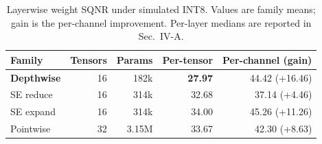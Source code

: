 \documentclass[conference,a4paper]{IEEEtran}
\begin{document}
\begin{table}[htbp]
\caption{Selective per-family static QDQ ablation for EfficientNet-B0 (MinMax, first 100 class-ordered training images, Coccidiosis only). Families are grouped from the ONNX graph; FP32 reference accuracy is 98.50\%.}
\label{tab:ablation}
\centering
\footnotesize
\setlength{\tabcolsep}{5pt}
\end{table}

\begin{table}[htbp]
\caption{Layerwise weight SQNR under simulated INT8. Values are family means; gain is the per-channel improvement. Per-layer medians are reported in Sec.~IV-A.}
\label{tab:sqnr}
\centering
\footnotesize
\setlength{\tabcolsep}{5pt}
\begin{tabular}{lrrrr}
\toprule
Family & Tensors & Params & Per-tensor & Per-channel (gain) \\
\midrule
\textbf{Depthwise} & 16 & 182k & \textbf{27.97} & 44.42 (+16.46) \\
SE reduce & 16 & 314k & 32.68 & 37.14 (+4.46) \\
SE expand & 16 & 314k & 34.00 & 45.26 (+11.26) \\
Pointwise & 32 & 3.15M & 33.67 & 42.30 (+8.63) \\
\bottomrule
\end{tabular}
\end{table}
\end{document}
